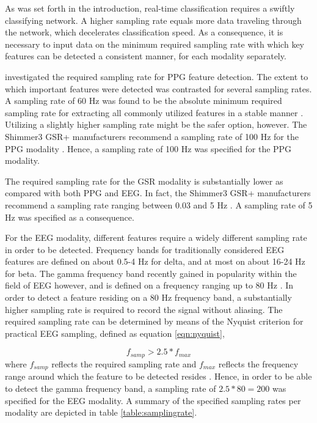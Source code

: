 \documentclass[12pt]{article}
\begin{document}
As was set forth in the introduction, real-time classification requires a swiftly classifying network. A higher sampling rate equals more data traveling through the network, which decelerates classification speed. As a consequence, it is necessary to input data on the minimum required sampling rate with which key features can be detected a consistent manner, for each modality separately. 

 investigated the required sampling rate for PPG feature detection. The extent to which important features were detected was contrasted for several sampling rates. A sampling rate of 60 Hz was found to be the absolute minimum required sampling rate for extracting all commonly utilized features in a stable manner \cite{fujita2019evaluation}. Utilizing a slightly higher sampling rate might be the safer option, however. The Shimmer3 GSR+ manufacturers recommend a sampling rate of 100 Hz for the PPG modality \cite{shimmer}. Hence, a sampling rate of 100 Hz was specified for the PPG modality. 

The required sampling rate for the GSR modality is substantially lower as compared with both PPG and EEG. In fact, the Shimmer3 GSR+ manufacturers recommend a sampling rate ranging between 0.03 and 5 Hz \cite{shimmer}. A sampling rate of 5 Hz was specified as a consequence. 

For the EEG modality, different features require a widely different sampling rate in order to be detected. Frequency bands for traditionally considered EEG features are defined on about 0.5-4 Hz for delta, and at most on about 16-24 Hz for beta. The gamma frequency band recently gained in popularity within the field of EEG however, and is defined on a frequency ranging up to 80 Hz \cite{weiergraeber2016sampling}. In order to detect a feature residing on a 80 Hz frequency band, a substantially higher sampling rate is required to record the signal without aliasing. The required sampling rate can be determined by means of the Nyquist criterion for practical EEG sampling, defined as equation \ref{eqn:nyquist},

\begin{equation}
\label{eqn:nyquist}
f_{samp} > 2.5 * f_{max}
\end{equation}
where $f_{samp}$ reflects the required sampling rate and $f_{max}$ reflects the frequency range around which the feature to be detected resides \cite{srinivasan1998estimating}. Hence, in order to be able to detect the gamma frequency band, a sampling rate of $2.5*80=200$ was specified for the EEG modality. A summary of the specified sampling rates per modality are depicted in table \ref{table:samplingrate}.
\end{document}
